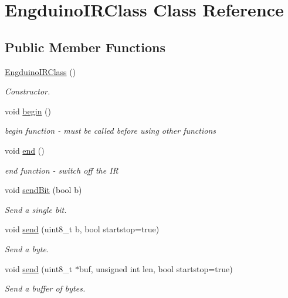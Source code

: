 \hypertarget{class_engduino_i_r_class}{}\section{Engduino\+I\+R\+Class Class Reference}
\label{class_engduino_i_r_class}
\subsection*{Public Member Functions}
\begin{DoxyCompactItemize}
\item 
\hyperlink{group___engduino_i_r_ga7a7733226d0614e9d7401d499cccb8de}{Engduino\+I\+R\+Class} ()
\begin{DoxyCompactList}\small\item\em Constructor. \end{DoxyCompactList}\item 
void \hyperlink{group___engduino_i_r_ga175bacdfa791bca99cf90400559d5a3c}{begin} ()
\begin{DoxyCompactList}\small\item\em begin function -\/ must be called before using other functions \end{DoxyCompactList}\item 
void \hyperlink{group___engduino_i_r_ga8ca0afe3a5b7eae3543b5717c95048cc}{end} ()
\begin{DoxyCompactList}\small\item\em end function -\/ switch off the I\+R \end{DoxyCompactList}\item 
void \hyperlink{group___engduino_i_r_gaf8b6552647c01a98d12f3acb98f50b8a}{send\+Bit} (bool b)
\begin{DoxyCompactList}\small\item\em Send a single bit. \end{DoxyCompactList}\item 
void \hyperlink{group___engduino_i_r_ga5380221a35dec8cae06e305a640047ad}{send} (uint8\+\_\+t b, bool startstop=true)
\begin{DoxyCompactList}\small\item\em Send a byte. \end{DoxyCompactList}\item 
void \hyperlink{group___engduino_i_r_gabcf780f269e0570a4dcd1f07f628ba17}{send} (uint8\+\_\+t $\ast$buf, unsigned int len, bool startstop=true)
\begin{DoxyCompactList}\small\item\em Send a buffer of bytes. \end{DoxyCompactList}\item 

\end{DoxyCompactItemize}
